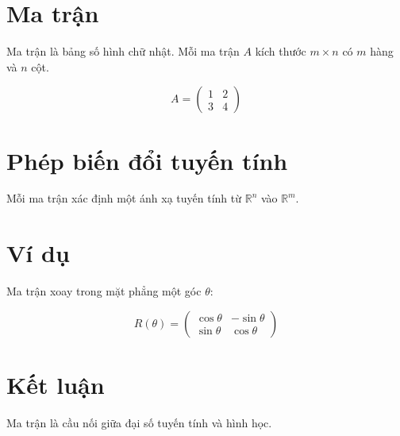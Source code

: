 \section{Ma trận}

Ma trận là bảng số hình chữ nhật. Mỗi ma trận \(A\) kích thước
\(m \times n\) có \(m\) hàng và \(n\) cột.

\begin{equation}
A = \begin{pmatrix} 1 & 2 \\ 3 & 4 \end{pmatrix}
\end{equation}

\section{Phép biến đổi tuyến tính}

Mỗi ma trận xác định một ánh xạ tuyến tính từ \(\mathbb{R}^n\) vào
\(\mathbb{R}^m\).

\section{Ví dụ}

Ma trận xoay trong mặt phẳng một góc \(\theta\):

\begin{equation}
R(\theta) = \begin{pmatrix} \cos\theta & -\sin\theta \\
\sin\theta & \cos\theta \end{pmatrix}
\end{equation}

\section{Kết luận}

Ma trận là cầu nối giữa đại số tuyến tính và hình học.
